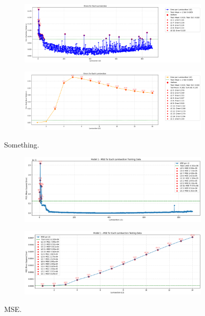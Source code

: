 \begin{figure}[H]
    \centering
    \begin{subfigure}[t]{1\textwidth}
        \centering
        \includegraphics[width=\textwidth]{images/euclid_train.png}
    \end{subfigure}
    \hfill
    \begin{subfigure}[t]{1\textwidth}
        \centering
        \includegraphics[width=\textwidth]{images/euclid_test_fake.png}
    \end{subfigure}
    \caption{Something.}
    \label{fig:euc_distance}
\end{figure}

\begin{figure}[H]
    \centering
    \begin{subfigure}[t]{1\textwidth}
        \centering
        \includegraphics[width=\textwidth]{images/MSE_train.png}
    \end{subfigure}
    \hfill
    \begin{subfigure}[t]{1\textwidth}
        \centering
        \includegraphics[width=\textwidth]{images/MSE_test.png}
    \end{subfigure}
    \caption{MSE.}
    \label{fig:MSE}
\end{figure}
